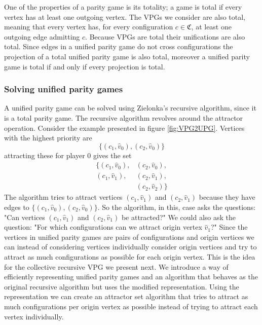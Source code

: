 One of the properties of a parity game is its totality; a game is total if every vertex has at least one outgoing vertex. The VPGs we consider are also total, meaning that every vertex has, for every configuration $c \in \mathfrak{C}$, at least one outgoing edge admitting $c$. Because VPGs are total their unifications are also total. Since edges in a unified parity game do not cross configurations the projection of a total unified parity game is also total, moreover a unified parity game is total if and only if every projection is total.

\subsubsection{Solving unified parity games}
A unified parity game can be solved using Zielonka's recursive algorithm, since it is a total parity game. The recursive algorithm revolves around the attractor operation. Consider the example presented in figure \ref{fig:VPG2UPG}. Vertices with the highest priority are 
\[ \{(c_1,\hat{v}_0),(c_2,\hat{v}_0)\}\]
attracting these for player $0$ gives the set 
\begin{align*}
\{(c_1,\hat{v}_0),&(c_2,\hat{v}_0),\\
(c_1,\hat{v}_1),&(c_2,\hat{v}_1),\\
 &(c_2,\hat{v}_2)\}
\end{align*}
The algorithm tries to attract vertices $(c_1,\hat{v}_1)$ and $(c_2,\hat{v}_1)$ because they have edges to $\{(c_1,\hat{v}_0), (c_2,\hat{v}_0)\}$. So the algorithm, in this, case asks the questions: "Can vertices $(c_1,\hat{v}_1)$ and $(c_2,\hat{v}_1)$ be attracted?" We could also ask the question: "For which configurations can we attract origin vertex $\hat{v}_1$?" Since the vertices in unified parity games are pairs of configurations and origin vertices we can instead of considering vertices individually consider origin vertices and try to attract as much configurations as possible for each origin vertex. This is the idea for the collective recursive VPG we present next. We introduce a way of efficiently representing unified parity games and an algorithm that behaves as the original recursive algorithm but uses the modified representation. Using the representation we can create an attractor set algorithm that tries to attract as much configurations per origin vertex as possible instead of trying to attract each vertex individually.

